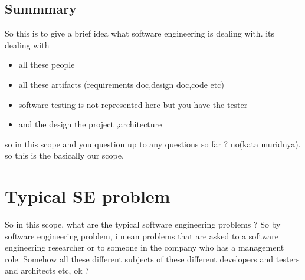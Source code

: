 \documentclass[conference, compsoc, twoside]{IEEEtran}
\begin{document}
\subsection{Summmary}
So this is to give a brief idea what software engineering is dealing with.
its dealing with 
\begin{itemize}
	\item all these people
	\item all these artifacts (requirements doc,design doc,code etc)
	\item software testing is not represented here but you have the tester
	\item and the design the project ,architecture	
\end{itemize}
so in this scope and you question up to any questions so far ?
no(kata muridnya). so this is the basically our scope.

\section{Typical SE problem} %
So in this scope, what are the typical software engineering problems ?
So by software engineering problem, i mean problems that are asked to a software engineering researcher or to someone in the company who has a management role. 
Somehow all these different subjects of these different developers and testers and architects etc, ok ? 
\end{document}
